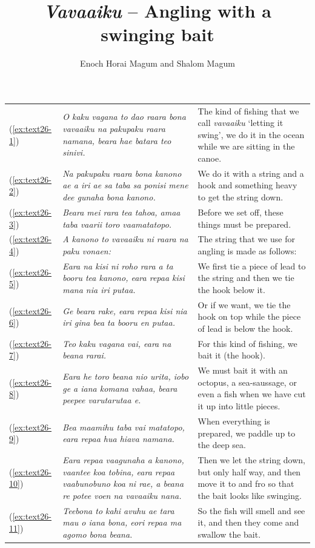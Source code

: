 \documentclass[output=paper]{langscibook}
\title{\textit{Vavaaiku} – Angling with a swinging bait}
\author{Enoch Horai Magum and Shalom Magum}
\begin{document}
\maketitle\label{chap:33}
\begin{xltabular}{\textwidth}{lXX}
	(\ref{ex:text26-1})&\textit{O kaku vagana to dao raara bona vavaaiku na pakupaku raara namana, beara hae batara teo sinivi.}&The kind of fishing that we call \textit{vavaaiku} `letting it swing', we do it in the ocean while we are sitting in the canoe.\\
	(\ref{ex:text26-2})&\textit{Na pakupaku raara bona kanono ae a iri ae sa taba sa ponisi mene dee gunaha bona kanono.}&We do it with a string and a hook and something heavy to get the string down.\\
	(\ref{ex:text26-3})&\textit{Beara mei rara tea tahoa, amaa taba vaarii toro vaamatatopo.}&Before we set off, these things must be prepared.\\
	(\ref{ex:text26-4})&\textit{A kanono to vavaaiku ni raara na paku vonaen:}&The string that we use for angling is made as follows:\\
	(\ref{ex:text26-5})&\textit{Eara na kisi ni roho rara a ta booru tea kanono, eara repaa kisi mana nia iri putaa.}&We first tie a piece of lead to the string and then we tie the hook below it.\\
	(\ref{ex:text26-6})&\textit{Ge beara rake, eara repaa kisi nia iri gina bea ta booru en putaa.}&Or if we want, we tie the hook on top while the piece of lead is below the hook.\\
	(\ref{ex:text26-7})&\textit{Teo kaku vagana vai, eara na beana rarai.}&For this kind of fishing, we bait it (the hook).\\
	(\ref{ex:text26-8})&\textit{Eara he toro beana nio urita, iobo ge a iana komana vahaa, beara peepee varutarutaa e.}&We must bait it with an octopus, a sea-saussage, or even a fish when we have cut it up into little pieces.\\
	(\ref{ex:text26-9})&\textit{Bea maamihu taba vai matatopo, eara repaa hua hiava namana.}&When everything is prepared, we paddle up to the deep sea.\\
	(\ref{ex:text26-10})&\textit{Eara repaa vaagunaha a kanono, vaantee koa tobina, eara repaa vaabunobuno koa ni rae, a beana re potee voen na vavaaiku nana.}&Then we let the string down, but only half way, and then move it to and fro so that the bait looks like swinging.\\
	(\ref{ex:text26-11})&\textit{Teebona to kahi avuhu ae tara mau o iana bona, eori repaa ma agomo bona beana.}&So the fish will smell and see it, and then they come and swallow the bait.\\

\end{xltabular}
\end{document}
